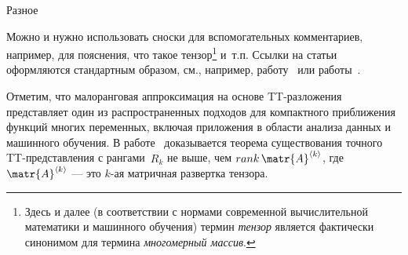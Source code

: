   {Разное}

  Можно и нужно использовать сноски для вспомогательных комментариев, например, для пояснения, что такое тензор\footnote{
    Здесь и далее (в соответствии с нормами современной вычислительной математики и машинного обучения) термин \textit{тензор} является фактически синонимом для термина \textit{многомерный массив}.
    } и~т.п.
  Ссылки на статьи оформляются стандартным образом, см., например, работу~\cite{oseledets2011tensortrain} или работы~\cite{dieterich2012empirical, jamil2013literature, singh2019abstract}.

  Отметим, что малоранговая аппроксимация на основе TT-разложения~\cite{oseledets2011tensortrain} представляет один из распространенных подходов для компактного приближения функций многих переменных, включая приложения в области анализа данных и машинного обучения.
  В работе~\cite{oseledets2011tensortrain} доказывается теорема существования точного TT-представления с рангами~$R_k$ не выше, чем $rank \, \matr{A}^{\langle k \rangle}$, где $\matr{A}^{\langle k \rangle}$ --- это $k$-ая матричная развертка тензора.

